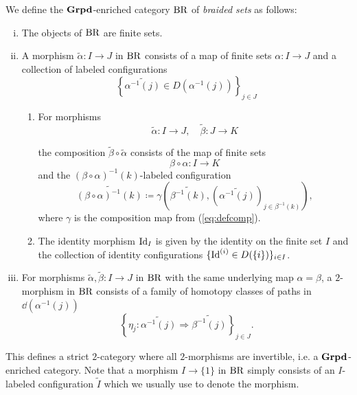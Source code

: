 \begin{defin}
    We define the $\operatorname{\textbf{Grpd}}$-enriched category $\operatorname{BR}$ of {\em braided sets} as follows:
    \begin{enumerate}[(i)]
        \item The objects of $\operatorname{BR}$ are finite sets.
        \item A morphism $\widetilde{\alpha} \colon I \to J$ in $\operatorname{BR}$ consists
        of a map of finite sets  $\alpha \colon I \to J$ and a collection of
        labeled configurations
        \[
            \left\{\widetilde{\alpha^{-1}(j)} \in D(\alpha^{-1}(j))\right\}_{j \in J}
        \]

        \begin{enumerate}
            \item For morphisms
        \[
            \widetilde{\alpha} \colon I \to J, \quad \widetilde{\beta} \colon J \to K
        \]
        
        the composition $\widetilde{\beta} \circ \widetilde{\alpha}$ consists of
        the map of finite sets
        \[
            \beta \circ \alpha \colon I \to K
        \]
        and the $(\beta \circ \alpha)^{-1}(k)$-labeled configuration
        \[
            \widetilde{(\beta \circ \alpha)^{-1}(k)} \coloneqq \gamma\left(\widetilde{\beta^{-1}(k)}, (\widetilde{\alpha^{-1}(j)})_{j \in \beta^{-1}(k)}\right),%
        \]
        where $\gamma$ is the composition map from
        (\ref{eq:defcomp}).
        
        \item The identity morphism $\operatorname{Id}_I$ is given by the identity on the
        finite set $I$ and the collection of identity configurations $\{\operatorname{Id}^{(i)}
        \in D(\{i\})\}_{i \in I}$.
        \end{enumerate}
        \item For morphisms $\widetilde{\alpha}, \widetilde{\beta} \colon I \to
        J$ in $\operatorname{BR}$ with the same underlying map $\alpha = \beta$, a
        $2$-morphism in $\operatorname{BR}$ consists of a family of homotopy classes of paths in $\dd(\alpha^{-1}(j))$
        \[
            \left\{\eta_j \colon \widetilde{\alpha^{-1}(j)} \Rightarrow \widetilde{\beta^{-1}(j)}\right\}_{j \in J}.
        \]
    \end{enumerate}
\end{defin}
This defines a strict $2$-category where all $2$-morphisms are invertible, i.e. a $\operatorname{\textbf{Grpd}}$-enriched category. Note
that a morphism $I \to \{1\}$ in $\operatorname{BR}$ simply consists of an $I$-labeled
configuration $\widetilde{I}$ which we usually use to denote the morphism. 

